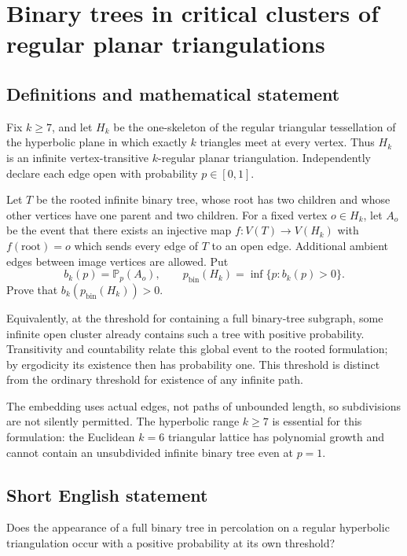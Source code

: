 \documentclass[11pt,a4paper]{article}
\begin{document}
\section*{Binary trees in critical clusters of regular planar triangulations}\label{statement}

\subsection{Definitions and mathematical statement}
Fix $k\ge7$, and let $H_k$ be the one-skeleton of the regular triangular tessellation of the hyperbolic plane in which exactly $k$ triangles meet at every vertex. Thus $H_k$ is an infinite vertex-transitive $k$-regular planar triangulation. Independently declare each edge open with probability $p\in[0,1]$.

Let $T$ be the rooted infinite binary tree, whose root has two children and whose other vertices have one parent and two children. For a fixed vertex $o\in H_k$, let $A_o$ be the event that there exists an injective map $f:V(T)\to V(H_k)$ with $f(\text{root})=o$ which sends every edge of $T$ to an open edge. Additional ambient edges between image vertices are allowed. Put
\[
b_k(p)=\mathbb P_p(A_o),\qquad
p_{\mathrm{bin}}(H_k)=\inf\{p:b_k(p)>0\}.
\]
Prove that $b_k(p_{\mathrm{bin}}(H_k))>0$.

Equivalently, at the threshold for containing a full binary-tree subgraph, some infinite open cluster already contains such a tree with positive probability. Transitivity and countability relate this global event to the rooted formulation; by ergodicity its existence then has probability one. This threshold is distinct from the ordinary threshold for existence of any infinite path.

The embedding uses actual edges, not paths of unbounded length, so subdivisions are not silently permitted. The hyperbolic range $k\ge7$ is essential for this formulation: the Euclidean $k=6$ triangular lattice has polynomial growth and cannot contain an unsubdivided infinite binary tree even at $p=1$.
\subsection{Short English statement}
Does the appearance of a full binary tree in percolation on a regular hyperbolic triangulation occur with a positive probability at its own threshold?
\end{document}
